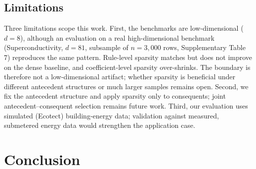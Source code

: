 \documentclass[review,1p,times]{elsarticle}
\begin{document}
\subsection{Limitations}

Three limitations scope this work.
First, the benchmarks are low-dimensional ($d=8$), although an evaluation on a real high-dimensional benchmark (Superconductivity, $d=81$, subsample of $n=3{,}000$ rows, Supplementary Table 7) reproduces the same pattern.
Rule-level sparsity matches but does not improve on the dense baseline, and coefficient-level sparsity over-shrinks.
The boundary is therefore not a low-dimensional artifact; whether sparsity is beneficial under different antecedent structures or much larger samples remains open. Second, we fix the antecedent structure and apply sparsity only to consequents; joint antecedent--consequent selection \cite{gu2018bayesian} remains future work. Third, our evaluation uses simulated (Ecotect) building-energy data; validation against measured, submetered energy data would strengthen the application case.

\section{Conclusion}
\label{sec:conclusion}
\end{document}
